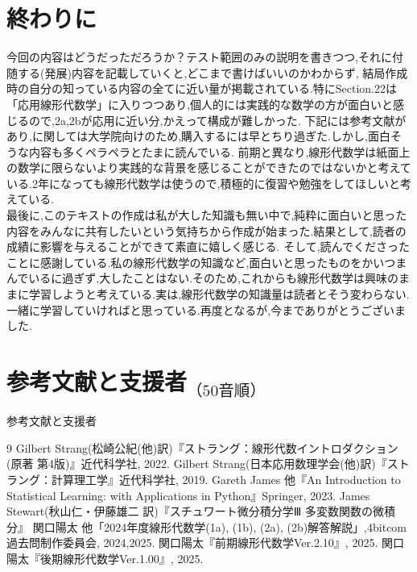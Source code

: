 \section{終わりに}
今回の内容はどうだっただろうか？テスト範囲のみの説明を書きつつ,それに付随する(発展)内容を記載していくと,どこまで書けばいいのかわからず,
結局作成時の自分の知っている内容の全てに近い量が掲載されている.特にSection.22は「応用線形代数学」に入りつつあり,個人的には実践的な数学の方が面白いと感じるので,2a,2bが応用に近い分,かえって構成が難しかった.
下記には参考文献があり,\cite{physics}に関しては大学院向けのため,購入するには早とちり過ぎた.しかし,面白そうな内容も多くペラペラとたまに読んでいる.
前期と異なり,線形代数学は紙面上の数学に限らないより実践的な背景を感じることができたのではないかと考えている.2年になっても線形代数学は使うので,積極的に復習や勉強をしてほしいと考えている.\\
\hspace{1em}
最後に,このテキストの作成は私が大した知識も無い中で,純粋に面白いと思った内容をみんなに共有したいという気持ちから作成が始まった.結果として,読者の成績に影響を与えることができて素直に嬉しく感じる.
そして,読んでくださったことに感謝している.私の線形代数学の知識など,面白いと思ったものをかいつまんでいるに過ぎず,大したことはない.そのため,これからも線形代数学は興味のままに学習しようと考えている.実は,線形代数学の知識量は読者とそう変わらない.
一緒に学習していければと思っている.再度となるが,今までありがとうございました.
\section{参考文献と支援者$_{（50音順）}$}{参考文献と支援者}
\begin{thebibliography}{9}
  Gilbert Strang(松崎公紀(他)訳)『ストラング：線形代数イントロダクション(原著 第4版)』近代科学社, 2022.
  Gilbert Strang(日本応用数理学会(他)訳)『ストラング：計算理工学』近代科学社, 2019.
  Gareth James 他『An Introduction to Statistical Learning: with Applications in Python』Springer, 2023.
  James Stewart(秋山仁・伊藤雄二 訳)『スチュワート微分積分学Ⅲ 多変数関数の微積分』
  関口陽太 他「2024年度線形代数学(1a), (1b), (2a), (2b)解答解説」,4bitcom過去問制作委員会, 2024,2025.
  関口陽太『前期線形代数学Ver.2.10』, 2025.
  関口陽太『後期線形代数学Ver.1.00』, 2025.
\end{thebibliography}
\newpage
